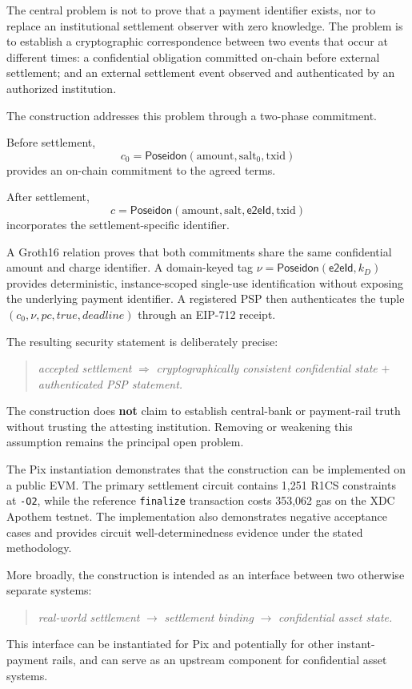 \documentclass[10pt,twocolumn]{article}
\newcommand{\Poseidon}{\ensuremath{\mathsf{Poseidon}}}
\newcommand{\eeid}{\ensuremath{\mathsf{e2eId}}}
\newcommand{\code}[1]{\texttt{#1}}
\newcommand{\amount}{\ensuremath{\text{amount}}}
\newcommand{\txid}{\ensuremath{\text{txid}}}
\newcommand{\salt}{\ensuremath{\text{salt}}}
\newcommand{\pc}{\ensuremath{\mathit{pc}}}
\begin{document}
The central problem is not to prove that a payment identifier exists,
nor to replace an institutional settlement observer with zero knowledge.
The problem is to establish a cryptographic correspondence between two
events that occur at different times: a confidential obligation
committed on-chain before external settlement; and an external
settlement event observed and authenticated by an authorized
institution.

The construction addresses this problem through a two-phase commitment.

Before settlement,
\[
c_0=\Poseidon(\amount,\salt_0,\txid)
\]
provides an on-chain commitment to the agreed terms.

After settlement,
\[
c=\Poseidon(\amount,\salt,\eeid,\txid)
\]
incorporates the settlement-specific identifier.

A Groth16 relation proves that both commitments share the same
confidential amount and charge identifier. A domain-keyed tag
$\nu=\Poseidon(\eeid,k_D)$ provides deterministic, instance-scoped
single-use identification without exposing the underlying payment
identifier. A registered PSP then authenticates the tuple
$(c_0,\nu,\pc,\mathit{true},\mathit{deadline})$ through an EIP-712
receipt.

The resulting security statement is deliberately precise:
\begin{quote}
\small
\emph{accepted settlement} $\Rightarrow$ \emph{cryptographically
consistent confidential state} $+$ \emph{authenticated PSP statement.}
\end{quote}
The construction does \textbf{not} claim to establish central-bank or
payment-rail truth without trusting the attesting institution. Removing
or weakening this assumption remains the principal open problem.

The Pix instantiation demonstrates that the construction can be
implemented on a public EVM. The primary settlement circuit contains
1,251 R1CS constraints at \code{-O2}, while the reference \code{finalize}
transaction costs 353,062 gas on the XDC Apothem testnet. The
implementation also demonstrates negative acceptance cases and provides
circuit well-determinedness evidence under the stated methodology.

More broadly, the construction is intended as an interface between two
otherwise separate systems:
\begin{quote}
\small
\emph{real-world settlement} $\rightarrow$ \emph{settlement binding}
$\rightarrow$ \emph{confidential asset state.}
\end{quote}
This interface can be instantiated for Pix and potentially for other
instant-payment rails, and can serve as an upstream component for
confidential asset systems.
\end{document}
